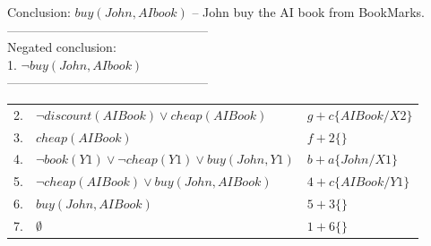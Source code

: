 \documentclass{article}%
\begin{document}
\begin{enumerate}
Conclusion: $ buy(John, AI book) $ -- John buy the AI book from BookMarks. \\
------------------------------------------------\\
Negated conclusion:  \\
1. $ \neg buy(John, AI book) $ \\
------------------------------------------------\\
\begin{tabular}{c|p{8cm}|l}
2. &$  \neg discount(AI Book) \vee cheap(AI Book) $ & $g + c \lbrace AI Book/X2 \rbrace $\\ 
3. & $ cheap(AI Book) $ &  $f + 2 \lbrace  \rbrace$ \\
4. &$ \neg book(Y1) \vee \neg cheap(Y1) \vee buy(John,Y1) $& $b + a \lbrace John / X1 \rbrace$\\
5. & $ \neg cheap(AI Book) \vee buy(John,AI Book) $ &$ 4 + c \lbrace AI Book / Y1 \rbrace$\\
6. & $ buy(John,AI Book) $ &$ 5 + 3 \lbrace \rbrace$\\
7. & $ \emptyset $ &$ 1 + 6 \lbrace \rbrace$\\
\end{tabular} 

\end{enumerate}
\end{document}
